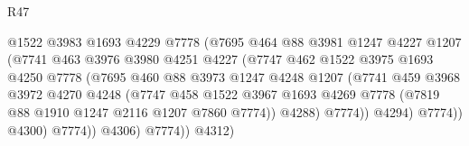 \begin{lexlean}{R47}
\begin{coremodule}
                                    @1522
                                    @3983
                                    @1693
                                    @4229
                                    @7778
                                    (@7695
                                      @464
                                      @88
                                      @3981
                                      @1247
                                      @4227
                                      @1207
                                      (@7741
                                        @463
                                        @3976
                                        @3980
                                        @4251
                                        @4227
                                        (@7747
                                          @462
                                          @1522
                                          @3975
                                          @1693
                                          @4250
                                          @7778
                                          (@7695
                                            @460
                                            @88
                                            @3973
                                            @1247
                                            @4248
                                            @1207
                                            (@7741
                                              @459
                                              @3968
                                              @3972
                                              @4270
                                              @4248
                                              (@7747
                                                @458
                                                @1522
                                                @3967
                                                @1693
                                                @4269
                                                @7778
                                                (@7819 @88 @1910 @1247 @2116 @1207 @7860 @7774))
                                              @4288)
                                            @7774))
                                        @4294)
                                      @7774))
                                  @4300)
                                @7774))
                            @4306)
                          @7774))
                      @4312)

\end{coremodule}
\end{lexlean}
